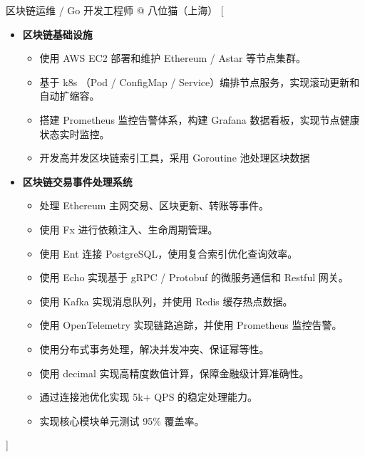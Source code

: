 \documentclass[zh]{resume}
\begin{document}
\begin{experiences}
    {区块链运维 / Go 开发工程师 @ 八位猫（上海）}%
    [\begin{itemize}
      \item \textbf{区块链基础设施}
        \begin{itemize}
          \item 使用 AWS EC2 部署和维护 Ethereum / Astar 等节点集群。
          \item 基于 k8s （Pod / ConfigMap / Service）编排节点服务，实现滚动更新和自动扩缩容。
          \item 搭建 Prometheus 监控告警体系，构建 Grafana 数据看板，实现节点健康状态实时监控。
          \item 开发高并发区块链索引工具，采用 Goroutine 池处理区块数据
        \end{itemize}
      \item \textbf{区块链交易事件处理系统}
        \begin{itemize}
          \item 处理 Ethereum 主网交易、区块更新、转账等事件。
          \item 使用 Fx 进行依赖注入、生命周期管理。
          \item 使用 Ent 连接 PostgreSQL，使用复合索引优化查询效率。
          \item 使用 Echo 实现基于 gRPC / Protobuf 的微服务通信和 Restful 网关。
          \item 使用 Kafka 实现消息队列，并使用 Redis 缓存热点数据。
          \item 使用 OpenTelemetry 实现链路追踪，并使用 Prometheus 监控告警。
          \item 使用分布式事务处理，解决并发冲突、保证幂等性。
          \item 使用 decimal 实现高精度数值计算，保障金融级计算准确性。
          \item 通过连接池优化实现 5k+ QPS 的稳定处理能力。
          \item 实现核心模块单元测试 95\% 覆盖率。
        \end{itemize}
      \end{itemize}]
\end{experiences}
\end{document}
